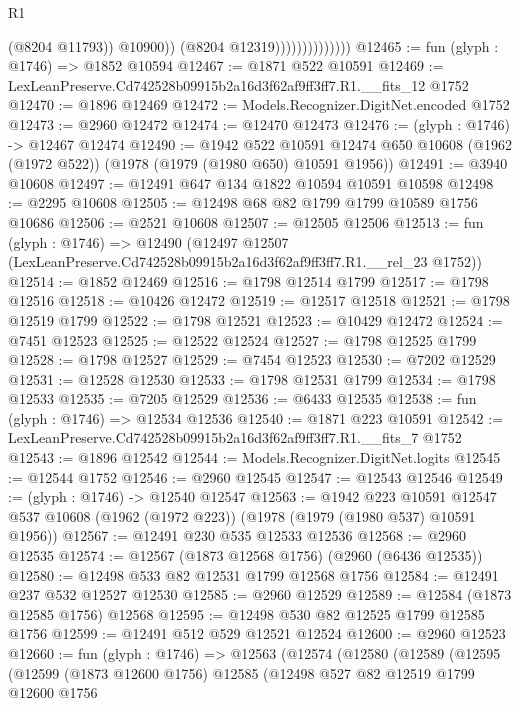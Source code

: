\begin{lexlean}{R1}
\begin{coremodule}
                                    (@8204 @11793))
                                  @10900))
                              (@8204 @12319))))))))))))))
@12465 := fun (glyph : @1746) => @1852 @10594
@12467 := @1871 @522 @10591
@12469 := LexLeanPreserve.Cd742528b09915b2a16d3f62af9ff3ff7.R1.__fits_12 @1752
@12470 := @1896 @12469
@12472 := Models.Recognizer.DigitNet.encoded @1752
@12473 := @2960 @12472
@12474 := @12470 @12473
@12476 := (glyph : @1746) -> @12467 @12474
@12490 := @1942
    @522
    @10591
    @12474
    @650
    @10608
    (@1962 (@1972 @522))
    (@1978 (@1979 (@1980 @650) @10591 @1956))
@12491 := @3940 @10608
@12497 := @12491 @647 @134 @1822 @10594 @10591 @10598
@12498 := @2295 @10608
@12505 := @12498 @68 @82 @1799 @1799 @10589 @1756 @10686
@12506 := @2521 @10608
@12507 := @12505 @12506
@12513 := fun (glyph : @1746) =>
  @12490 (@12497 @12507 (LexLeanPreserve.Cd742528b09915b2a16d3f62af9ff3ff7.R1.__rel_23 @1752))
@12514 := @1852 @12469
@12516 := @1798 @12514 @1799
@12517 := @1798 @12516
@12518 := @10426 @12472
@12519 := @12517 @12518
@12521 := @1798 @12519 @1799
@12522 := @1798 @12521
@12523 := @10429 @12472
@12524 := @7451 @12523
@12525 := @12522 @12524
@12527 := @1798 @12525 @1799
@12528 := @1798 @12527
@12529 := @7454 @12523
@12530 := @7202 @12529
@12531 := @12528 @12530
@12533 := @1798 @12531 @1799
@12534 := @1798 @12533
@12535 := @7205 @12529
@12536 := @6433 @12535
@12538 := fun (glyph : @1746) => @12534 @12536
@12540 := @1871 @223 @10591
@12542 := LexLeanPreserve.Cd742528b09915b2a16d3f62af9ff3ff7.R1.__fits_7 @1752
@12543 := @1896 @12542
@12544 := Models.Recognizer.DigitNet.logits
@12545 := @12544 @1752
@12546 := @2960 @12545
@12547 := @12543 @12546
@12549 := (glyph : @1746) -> @12540 @12547
@12563 := @1942
    @223
    @10591
    @12547
    @537
    @10608
    (@1962 (@1972 @223))
    (@1978 (@1979 (@1980 @537) @10591 @1956))
@12567 := @12491 @230 @535 @12533 @12536
@12568 := @2960 @12535
@12574 := @12567 (@1873 @12568 @1756) (@2960 (@6436 @12535))
@12580 := @12498 @533 @82 @12531 @1799 @12568 @1756
@12584 := @12491 @237 @532 @12527 @12530
@12585 := @2960 @12529
@12589 := @12584 (@1873 @12585 @1756) @12568
@12595 := @12498 @530 @82 @12525 @1799 @12585 @1756
@12599 := @12491 @512 @529 @12521 @12524
@12600 := @2960 @12523
@12660 := fun (glyph : @1746) =>
  @12563
    (@12574
      (@12580
        (@12589
          (@12595
            (@12599
              (@1873 @12600 @1756)
              @12585
              (@12498
                @527
                @82
                @12519
                @1799
                @12600
                @1756

\end{coremodule}
\end{lexlean}
